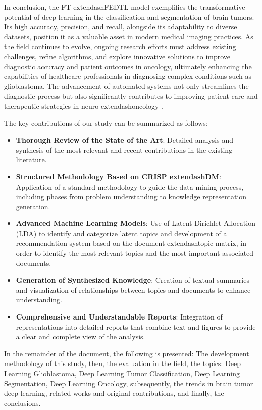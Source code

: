 \documentclass[runningheads]{llncs}
\begin{document}
In conclusion, the FT	extendash{}FEDTL model exemplifies the transformative potential of deep learning in the classification and segmentation of brain tumors. Its high accuracy, precision, and recall, alongside its adaptability to diverse datasets, position it as a valuable asset in modern medical imaging practices. As the field continues to evolve, ongoing research efforts must address existing challenges, refine algorithms, and explore innovative solutions to improve diagnostic accuracy and patient outcomes in oncology, ultimately enhancing the capabilities of healthcare professionals in diagnosing complex conditions such as glioblastoma. The advancement of automated systems not only streamlines the diagnostic process but also significantly contributes to improving patient care and therapeutic strategies in neuro	extendash{}oncology \cite{Istiak_2024}.

The key contributions of our study can be summarized as follows: 

\begin{itemize}
    \item \textbf{Thorough Review of the State of the Art}: Detailed analysis and synthesis of the most relevant and recent contributions in the existing literature.
    \item \textbf{Structured Methodology Based on CRISP	extendash{}DM}: Application of a standard methodology to guide the data mining process, including phases from problem understanding to knowledge representation generation.
    \item \textbf{Advanced Machine Learning Models}: Use of Latent Dirichlet Allocation (LDA) to identify and categorize latent topics and development of a recommendation system based on the document	extendash{}topic matrix, in order to identify the most relevant topics and the most important associated documents.
    \item \textbf{Generation of Synthesized Knowledge}: Creation of textual summaries and visualization of relationships between topics and documents to enhance understanding.
    \item \textbf{Comprehensive and Understandable Reports}: Integration of representations into detailed reports that combine text and figures to provide a clear and complete view of the analysis.
\end{itemize}

In the remainder of the document, the following is presented: The development methodology of this study, then, the evaluation in the field, the topics: Deep Learning Glioblastoma, Deep Learning Tumor Classification, Deep Learning Segmentation, Deep Learning Oncology,  subsequently, the trends in brain tumor deep learning, related works and original contributions, and finally, the conclusions.
\end{document}
